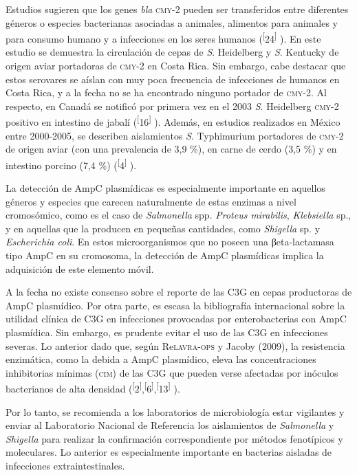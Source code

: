\documentclass{article}
\begin{document}
Estudios sugieren que los genes \textit{bla}
\textsc{cmy}-2 pueden ser transferidos entre diferentes géneros o especies bacterianas
asociadas a animales, alimentos para animales y para consumo humano y a
infecciones en los seres humanos (\textsuperscript{[}24\textsuperscript{]}
). En este estudio se demuestra la circulación de cepas de \textit{S}. Heidelberg y \textit{S}. Kentucky de origen aviar portadoras de \textsc{cmy}-2 en Costa Rica. Sin embargo, cabe
destacar que estos serovares se aíslan con muy poca frecuencia de infecciones de
humanos en Costa Rica, y a la fecha no se ha encontrado ninguno portador de
\textsc{cmy}-2. Al respecto, en Canadá se notificó por primera vez en el 2003 \textit{S}. Heidelberg \textsc{cmy}-2 positivo en intestino de jabalí
(\textsuperscript{[}16\textsuperscript{]}
). Además, en estudios realizados en México entre 2000-2005, se describen
aislamientos \textit{S}. Typhimurium portadores de \textsc{cmy}-2 de origen aviar (con una prevalencia de 3,9
\%), en carne de cerdo (3,5 \%) y en intestino porcino (7,4 \%)
(\textsuperscript{[}4\textsuperscript{]}
).

La detección de AmpC plasmídicas es especialmente importante en aquellos géneros
y especies que carecen naturalmente de estas enzimas a nivel cromosómico, como
es el caso de \textit{Salmonella}
spp. \textit{Proteus mirabilis}, \textit{Klebsiella}
sp., y en aquellas que la producen en pequeñas cantidades, como
\textit{Shigella}
sp. y \textit{Escherichia coli}. En estos microorganismos que no poseen una βeta-lactamasa tipo AmpC en su
cromosoma, la detección de AmpC plasmídicas implica la adquisición de este
elemento móvil.

A la fecha no existe consenso sobre el reporte de las C3G en cepas productoras
de AmpC plasmídico. Por otra parte, es escasa la bibliografía internacional
sobre la utilidad clínica de C3G en infecciones provocadas por enterobacterias
con AmpC plasmídica. Sin embargo, es prudente evitar el uso de las C3G en
infecciones severas. Lo anterior dado que, según Re\textsc{lavra}-\textsc{ops} y Jacoby (2009), la
resistencia enzimática, como la debida a AmpC plasmídico, eleva las
concentraciones inhibitorias mínimas (\textsc{cim}) de las C3G que pueden verse afectadas
por inóculos bacterianos de alta densidad
(\textsuperscript{[}2\textsuperscript{]},\textsuperscript{[}6\textsuperscript{]},\textsuperscript{[}13\textsuperscript{]}
).

Por lo tanto, se recomienda a los laboratorios de microbiología estar vigilantes
y enviar al Laboratorio Nacional de Referencia los aislamientos de
\textit{Salmonella}
y \textit{Shigella}
para realizar la confirmación correspondiente por métodos fenotípicos y
moleculares. Lo anterior es especialmente importante en bacterias aisladas de
infecciones extraintestinales.
\end{document}
